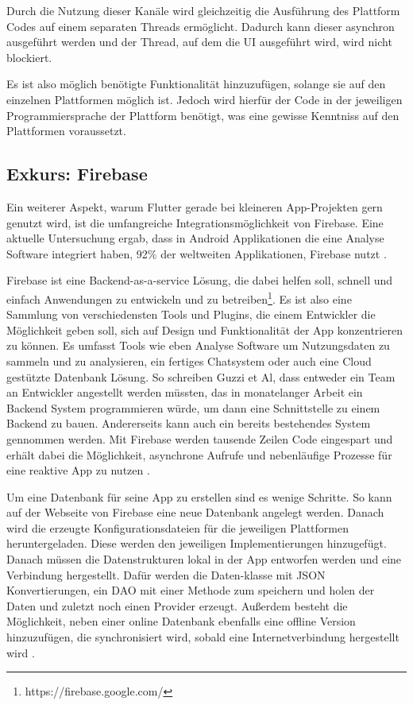 
Durch die Nutzung dieser Kanäle wird gleichzeitig die Ausführung des Plattform Codes auf einem separaten Threads ermöglicht. Dadurch kann dieser asynchron ausgeführt werden und der Thread, auf dem die \ac{UI} ausgeführt wird, wird nicht blockiert\cite{plattform_code_flutter}.

Es ist also möglich benötigte Funktionalität hinzuzufügen, solange sie auf den einzelnen Plattformen möglich ist. Jedoch wird hierfür der Code in der jeweiligen Programmiersprache der Plattform benötigt, was eine gewisse Kenntniss auf den Plattformen voraussetzt.

\subsection{Exkurs: Firebase}
Ein weiterer Aspekt, warum Flutter gerade bei kleineren App-Projekten gern genutzt wird, ist die umfangreiche Integrationsmöglichkeit von Firebase. Eine aktuelle Untersuchung ergab, dass in Android Applikationen die eine Analyse Software integriert haben, 92\% der weltweiten Applikationen, Firebase nutzt \cite{statist_analytics_SDK}.

Firebase ist eine Backend-as-a-service Lösung, die dabei helfen soll, schnell und einfach Anwendungen zu entwickeln und zu betreiben\footnote{https://firebase.google.com/}. Es ist also eine Sammlung von verschiedensten Tools und Plugins, die einem Entwickler die Möglichkeit geben soll, sich auf Design und Funktionalität der App konzentrieren zu können. Es umfasst Tools wie eben Analyse Software um Nutzungsdaten zu sammeln und zu analysieren, ein fertiges Chatsystem oder auch eine Cloud gestützte Datenbank Lösung. So schreiben Guzzi et Al, dass entweder ein Team an Entwickler angestellt werden müssten, das in monatelanger Arbeit ein Backend System programmieren würde, um dann eine Schnittstelle zu einem Backend zu bauen. Andererseits kann auch ein bereits bestehendes System gennommen werden. Mit Firebase werden tausende Zeilen Code eingespart und erhält dabei die Möglichkeit, asynchrone Aufrufe und nebenläufige Prozesse für eine reaktive App zu nutzen \cite[p.~608]{Flutter_Apprentice}.

Um eine Datenbank für seine App zu erstellen sind es wenige Schritte. So kann auf der Webseite von Firebase eine neue Datenbank angelegt werden. Danach wird die erzeugte Konfigurationsdateien für die jeweiligen Plattformen heruntergeladen. Diese werden den jeweiligen Implementierungen hinzugefügt. Danach müssen die Datenstrukturen lokal in der App entworfen werden und eine Verbindung hergestellt. Dafür werden die Daten-klasse mit JSON Konvertierungen, ein \ac{DAO} mit einer Methode zum speichern und holen der Daten und zuletzt noch einen Provider erzeugt. Außerdem besteht die Möglichkeit, neben einer online Datenbank ebenfalls eine offline Version hinzuzufügen, die synchronisiert wird, sobald eine Internetverbindung hergestellt wird \cite{Flutter_Apprentice}.

